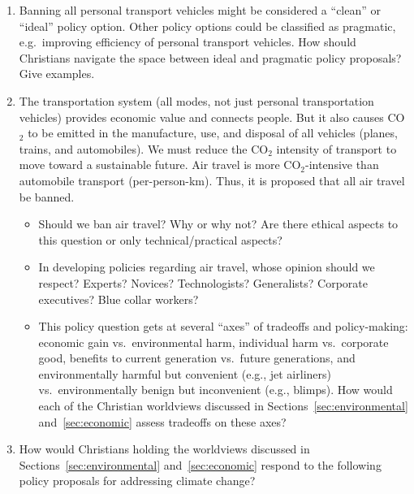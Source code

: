 \documentclass[12pt]{article}
\begin{document}
\begin{enumerate}
\begin{itemize}
		\end{itemize}
		
  \item Banning all personal transport vehicles might be considered a ``clean'' or ``ideal'' policy option.
        Other policy options could be classified as pragmatic, 
		e.g.\ improving efficiency of personal transport vehicles.
		How should Christians navigate the space between ideal and pragmatic policy proposals? 
		Give examples.

  \item The transportation system (all modes, not just personal transportation vehicles) 
        provides economic value and connects people. 
        But it also causes CO$_2$ to be emitted in the manufacture, use, and disposal 
		of all vehicles (planes, trains, and automobiles). 
		We must reduce the CO$_2$ intensity of transport to move toward a sustainable future. 
		Air travel is more CO$_2$-intensive than automobile transport (per-person-km). 
		Thus, it is proposed that all air travel be banned.

		\begin{itemize}

		  \item Should we ban air travel? 
		        Why or why not? 
				Are there ethical aspects to this question or 
				only technical/practical aspects? 

		  \item In developing policies regarding air travel, whose opinion should we respect? 
		        Experts? Novices? 
				Technologists? Generalists? 
				Corporate executives? Blue collar workers?
				
  		  \item This policy question gets at several “axes” of tradeoffs and policy-making:
		        economic gain vs.\ environmental harm, 
				individual harm vs.\ corporate good, 
				benefits to current generation vs.\ future generations, and 
				environmentally harmful but convenient (e.g., jet airliners) vs.\ 
			    environmentally benign but inconvenient (e.g., blimps).
				How would each of the Christian worldviews discussed in Sections~\ref{sec:environmental}
				and~\ref{sec:economic} assess tradeoffs on these axes?
				
		\end{itemize}
		
  \item How would Christians holding the worldviews discussed 
        in Sections~\ref{sec:environmental} and~\ref{sec:economic} 
		respond to the following policy proposals
		for addressing climate change?
		\begin{itemize}


\end{itemize}
\end{enumerate}
\end{document}
